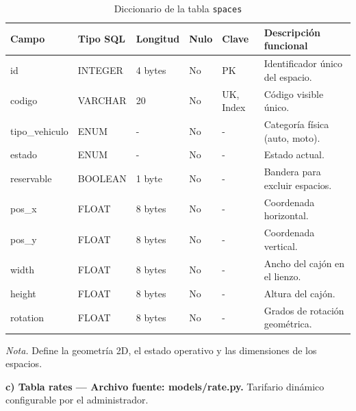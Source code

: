 \begin{table}[htbp]
\caption{Diccionario de la tabla \texttt{spaces}}
\label{tab:dict_spaces}
\begin{tabular}{@{}p{4cm} p{3cm} p{1.5cm} p{1cm} p{1.5cm} p{4cm}@{}}
\toprule
\textbf{Campo} & \textbf{Tipo SQL} & \textbf{Longitud} & \textbf{Nulo} & \textbf{Clave} & \textbf{Descripción funcional} \\
\midrule
id & INTEGER & 4 bytes & No & PK & Identificador único del espacio. \\
codigo & VARCHAR & 20 & No & UK, Index & Código visible único. \\
tipo\_vehiculo & ENUM & - & No & - & Categoría física (auto, moto). \\
estado & ENUM & - & No & - & Estado actual. \\
reservable & BOOLEAN & 1 byte & No & - & Bandera para excluir espacios. \\
pos\_x & FLOAT & 8 bytes & No & - & Coordenada horizontal. \\
pos\_y & FLOAT & 8 bytes & No & - & Coordenada vertical. \\
width & FLOAT & 8 bytes & No & - & Ancho del cajón en el lienzo. \\
height & FLOAT & 8 bytes & No & - & Altura del cajón. \\
rotation & FLOAT & 8 bytes & No & - & Grados de rotación geométrica. \\
\bottomrule
\end{tabular}
\par\vspace{0.2cm}
\textit{Nota.} Define la geometría 2D, el estado operativo y las dimensiones de los espacios.
\end{table}

\clearpage\textbf{c) Tabla rates — Archivo fuente: models/rate.py.} Tarifario dinámico configurable por el administrador.

